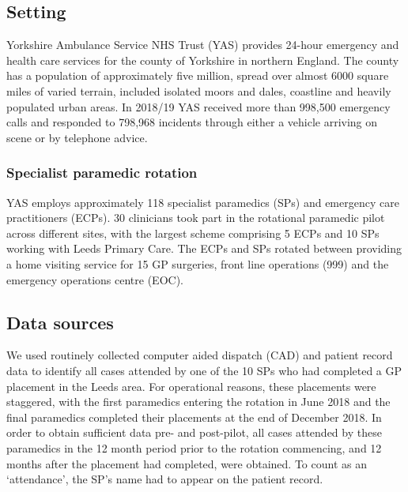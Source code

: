 \documentclass[
  a4paper,
  openany]{article}
\begin{document}
\hypertarget{setting}{%
\subsection*{Setting}\label{setting}}

Yorkshire Ambulance Service NHS Trust (YAS) provides 24-hour emergency and health care services for the county of Yorkshire in northern England. The county has a population of approximately five million, spread over almost 6000 square miles of varied terrain, included isolated moors and dales, coastline and heavily populated urban areas. In 2018/19 YAS received more than 998,500 emergency calls and responded to 798,968 incidents through either a vehicle arriving on scene or by telephone advice.

\hypertarget{specialist-paramedic-rotation}{%
\subsubsection*{Specialist paramedic rotation}\label{specialist-paramedic-rotation}}

YAS employs approximately 118 specialist paramedics (SPs) and emergency care practitioners (ECPs). 30 clinicians took part in the rotational paramedic pilot across different sites, with the largest scheme comprising 5 ECPs and 10 SPs working with Leeds Primary Care. The ECPs and SPs rotated between providing a home visiting service for 15 GP surgeries, front line operations (999) and the emergency operations centre (EOC).

\hypertarget{data-sources}{%
\subsection*{Data sources}\label{data-sources}}

We used routinely collected computer aided dispatch (CAD) and patient record data to identify all cases attended by one of the 10 SPs who had completed a GP placement in the Leeds area. For operational reasons, these placements were staggered, with the first paramedics entering the rotation in June 2018 and the final paramedics completed their placements at the end of December 2018. In order to obtain sufficient data pre- and post-pilot, all cases attended by these paramedics in the 12 month period prior to the rotation commencing, and 12 months after the placement had completed, were obtained. To count as an `attendance', the SP's name had to appear on the patient record.
\end{document}
